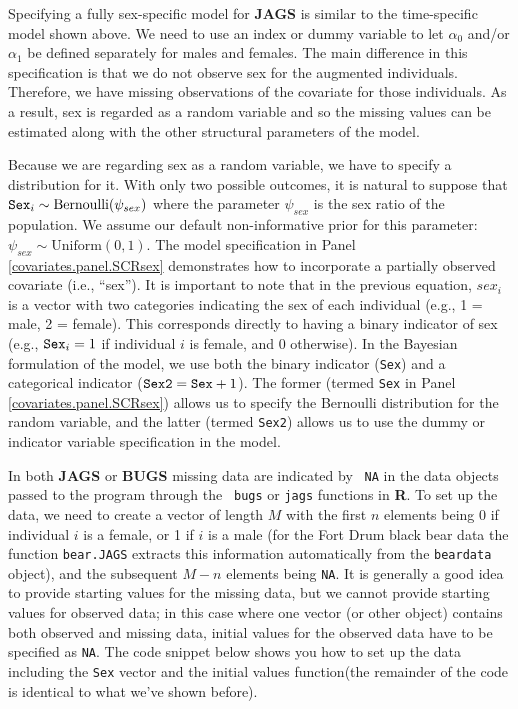 Specifying a fully sex-specific model for {\bf JAGS} is similar to the
time-specific model shown above. We need to use an index or dummy
variable to let $\alpha_0$ and/or $\alpha_1$ be defined separately for
males and females. The main difference in this specification is that we do
not observe sex for the augmented individuals. Therefore, we have
missing observations of the covariate for those individuals. As a
result, sex is regarded as a random variable and so the missing values
can be estimated along with the other structural parameters of the
model.    

Because we are regarding sex as a random variable, 
we have to specify a distribution for it.  
With only two possible outcomes, it is natural to suppose that
$\mbox{\tt Sex}_{i} \sim
\mbox{Bernoulli}(\psi_{sex})$ where the parameter $\psi_{sex}$ is the sex ratio of the
population.  
We assume our default non-informative prior for this parameter:
$\psi_{sex} \sim \mbox{Uniform}(0,1)$.  The model
specification in Panel \ref{covariates.panel.SCRsex} demonstrates how
to incorporate a partially observed covariate (i.e., ``sex'').
It is important to note that in the previous equation,
$sex_{i}$ is a vector with two categories indicating the sex of
each individual (e.g., 1 = male, 2 = female).  This corresponds
directly to having a binary indicator of sex 
(e.g., $\mbox{\tt Sex}_{i} = 1$ if individual $i$ is female, and 0 otherwise).
In the Bayesian formulation of the model, we use 
both the binary indicator ({\tt Sex}) and a categorical
indicator ($\mbox{\tt Sex2} = \mbox{\tt Sex} + 1$).  The former (termed {\tt Sex} in 
Panel \ref{covariates.panel.SCRsex}) allows us to specify the \mbox{Bernoulli} 
distribution for the random variable, and the latter (termed {\tt Sex2}) allows
us to use the dummy or indicator variable specification in the model.


In both {\bf JAGS} or {\bf BUGS} missing data are indicated by  {\tt
  NA} in the data objects passed to the program through the \mbox{\tt
  bugs} or \mbox{\tt jags} functions in {\bf R}. To set up the data,
we need to create a 
vector of length $M$ with the first $n$ elements being 0 if individual
$i$ is a female, or 1 if $i$ is a male (for the Fort Drum black bear
data the function {\tt bear.JAGS} extracts this information
automatically from the {\tt beardata} object), and the subsequent
$M-n$ elements being {\tt NA}.  It is generally a good idea to provide
starting values for the missing data, but we cannot provide starting
values for observed data; in this case where one vector (or other
object) contains both observed and missing data, initial values for
the observed data have to be specified as {\tt NA}.  The code snippet
below shows you how to set up the data including the {\tt Sex} vector
and the initial values function(the remainder of the code is identical to what we've
shown before).  

